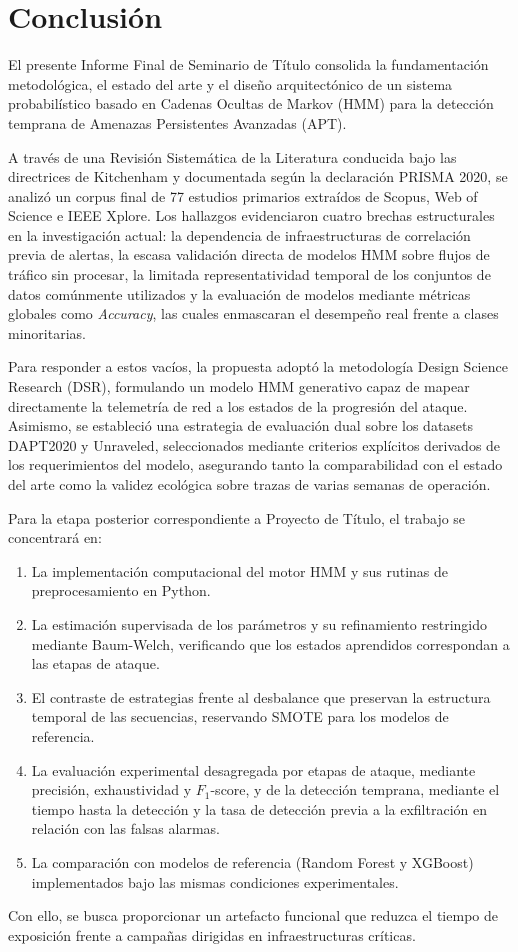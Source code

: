 \chapter{Conclusión}
El presente Informe Final de Seminario de Título consolida la fundamentación metodológica, el estado del arte y el diseño arquitectónico de un sistema probabilístico basado en Cadenas Ocultas de Markov (HMM) para la detección temprana de Amenazas Persistentes Avanzadas (APT).

A través de una Revisión Sistemática de la Literatura conducida bajo las directrices de Kitchenham y documentada según la declaración PRISMA 2020, se analizó un corpus final de 77 estudios primarios extraídos de Scopus, Web of Science e IEEE Xplore. Los hallazgos evidenciaron cuatro brechas estructurales en la investigación actual: la dependencia de infraestructuras de correlación previa de alertas, la escasa validación directa de modelos HMM sobre flujos de tráfico sin procesar, la limitada representatividad temporal de los conjuntos de datos comúnmente utilizados y la evaluación de modelos mediante métricas globales como \textit{Accuracy}, las cuales enmascaran el desempeño real frente a clases minoritarias.

Para responder a estos vacíos, la propuesta adoptó la metodología Design Science Research (DSR), formulando un modelo HMM generativo capaz de mapear directamente la telemetría de red a los estados de la progresión del ataque. Asimismo, se estableció una estrategia de evaluación dual sobre los datasets DAPT2020 y Unraveled, seleccionados mediante criterios explícitos derivados de los requerimientos del modelo, asegurando tanto la comparabilidad con el estado del arte como la validez ecológica sobre trazas de varias semanas de operación.

Para la etapa posterior correspondiente a Proyecto de Título, el trabajo se concentrará en: 
\begin{enumerate}
    \item La implementación computacional del motor HMM y sus rutinas de preprocesamiento en Python.
    \item La estimación supervisada de los parámetros y su refinamiento restringido mediante Baum-Welch, verificando que los estados aprendidos correspondan a las etapas de ataque.
    \item El contraste de estrategias frente al desbalance que preservan la estructura temporal de las secuencias, reservando SMOTE para los modelos de referencia.
    \item La evaluación experimental desagregada por etapas de ataque, mediante precisión, exhaustividad y $F_1$-score, y de la detección temprana, mediante el tiempo hasta la detección y la tasa de detección previa a la exfiltración en relación con las falsas alarmas.
    \item La comparación con modelos de referencia (Random Forest y XGBoost) implementados bajo las mismas condiciones experimentales.
\end{enumerate}

Con ello, se busca proporcionar un artefacto funcional que reduzca el tiempo de exposición frente a campañas dirigidas en infraestructuras críticas.